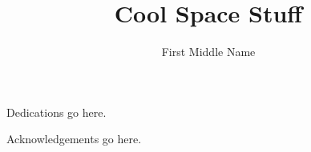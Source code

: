 \documentclass{ut-thesis}
\author{First Middle Name} %
\title{Cool Space Stuff}
\begin{document}
  \frontmatter
    \maketitle
    \begin{abstract}
      
    \end{abstract}
    \begin{dedication}
      Dedications go here.
    \end{dedication}
    \begin{acknowledgements}
      Acknowledgements go here.
    \end{acknowledgements}
    \tableofcontents
    \listoftables
    \listoffigures
  \mainmatter
    
    
    
    
    
  \appendix
  \backmatter
  
\end{document}
